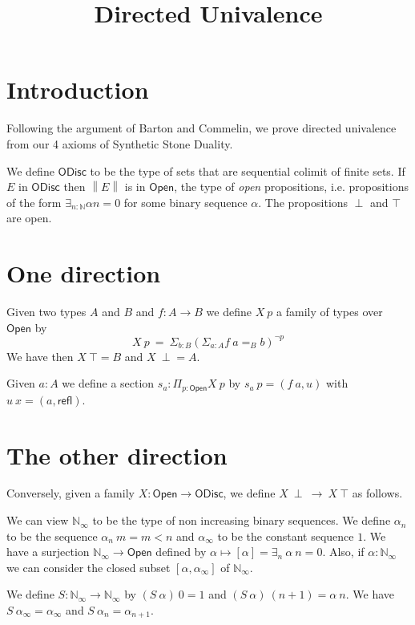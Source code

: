 \documentclass[10pt,a4paper]{article}
\newcommand{\nats}{\mathbb{N}}
\newcommand{\ODisc}{\mathsf{ODisc}}
\newcommand{\Open}{\mathsf{Open}}
\newcommand{\refl}{\mathsf{refl}}
\newcommand{\Noo}{\nats_{\infty}}
\newcommand\norm[1]{\left\lVert #1 \right\rVert}
\begin{document}
\title{Directed Univalence}

\author{}
\date{}
\maketitle


\section*{Introduction}

Following the argument of Barton and Commelin, we prove directed univalence from
our 4 axioms of Synthetic Stone Duality.

We define $\ODisc$ to be the type of sets that are sequential colimit of finite sets.
If $E$ in $\ODisc$ then $\norm{E}$ is in $\Open$, the type of {\em open} propositions, i.e.
propositions of the form $\exists_{n:\nats}\alpha n = 0$ for some binary sequence $\alpha$.
The propositions $\perp$ and $\top$ are open. 

\section{One direction}

Given two types $A$ and $B$ and $f:A\rightarrow B$ we define $X~p$ a family of types
over $\Open$ by
$$
X~p ~=~\Sigma_{b:B} (\Sigma_{a:A}f~a =_B b)^{\neg p}
$$
We have then $X~\top = B$ and $X~\perp = A$.

Given $a:A$ we define a section $s_a:\Pi_{p:\Open}X~p$ by
$s_a~p = (f~a,u)$ with $u~x = (a,\refl)$.

\section{The other direction}

Conversely, given a family $X:\Open\rightarrow\ODisc$, we define
$X~\perp~\rightarrow~ X~\top$ as follows.

We can view $\Noo$ to be the type of non increasing binary sequences.
We define $\alpha_n$ to be the sequence $\alpha_n~m = m<n$ and
$\alpha_{\infty}$ to be the constant sequence $1$.
We have a surjection $\Noo\rightarrow \Open$ defined by $\alpha\mapsto [\alpha] = \exists_n~\alpha~n = 0$.
Also, if $\alpha:\Noo$ we can consider the closed subset $[\alpha,\alpha_{\infty}]$ of $\Noo$.

We define $S:\Noo\rightarrow \Noo$ by $(S~\alpha)~0 = 1$ and $(S~\alpha)~(n+1) = \alpha~n$.
We have $S~\alpha_{\infty} = \alpha_{\infty}$ and $S~\alpha_n = \alpha_{n+1}$.
\end{document}
